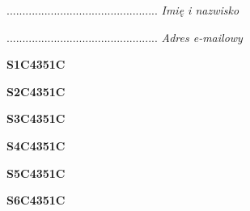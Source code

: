 \begin{turn}{90}\begin{minipage}{\linewidth} \vspace{20mm} ................................................  \textit{Imię i nazwisko}\end{minipage}\end{turn}

\begin{turn}{90}\begin{minipage}{\linewidth} \vspace{20mm} ................................................  \textit{Adres e-mailowy}\end{minipage}\end{turn}

\begin{turn}{90}\huge \begin{minipage}{\linewidth} \vspace{10mm}\textbf{S1C4351C}\end{minipage}\end{turn}

\begin{turn}{90}\huge \begin{minipage}{\linewidth} \vspace{10mm}\textbf{S2C4351C}\end{minipage}\end{turn}

\begin{turn}{90}\huge \begin{minipage}{\linewidth} \vspace{10mm}\textbf{S3C4351C}\end{minipage}\end{turn}

\begin{turn}{90}\huge \begin{minipage}{\linewidth} \vspace{10mm}\textbf{S4C4351C}\end{minipage}\end{turn}

\begin{turn}{90}\huge \begin{minipage}{\linewidth} \vspace{10mm}\textbf{S5C4351C}\end{minipage}\end{turn}

\begin{turn}{90}\huge \begin{minipage}{\linewidth} \vspace{10mm}\textbf{S6C4351C}\end{minipage}\end{turn}

